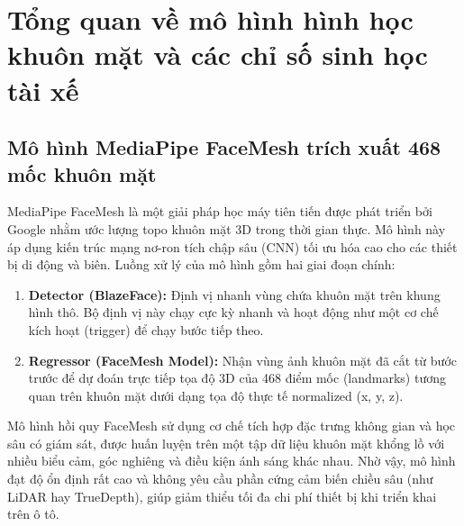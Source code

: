 \documentclass[../DoAn.tex]{subfiles}
\begin{document}
\section{Tổng quan về mô hình hình học khuôn mặt và các chỉ số sinh học tài xế}
\label{section:3.1}

\subsection{Mô hình MediaPipe FaceMesh trích xuất 468 mốc khuôn mặt}
MediaPipe FaceMesh là một giải pháp học máy tiên tiến được phát triển bởi Google nhằm ước lượng topo khuôn mặt 3D trong thời gian thực. Mô hình này áp dụng kiến trúc mạng nơ-ron tích chập sâu (CNN) tối ưu hóa cao cho các thiết bị di động và biên. Luồng xử lý của mô hình gồm hai giai đoạn chính:
\begin{enumerate}
    \item \textbf{Detector (BlazeFace):} Định vị nhanh vùng chứa khuôn mặt trên khung hình thô. Bộ định vị này chạy cực kỳ nhanh và hoạt động như một cơ chế kích hoạt (trigger) để chạy bước tiếp theo.
    \item \textbf{Regressor (FaceMesh Model):} Nhận vùng ảnh khuôn mặt đã cắt từ bước trước để dự đoán trực tiếp tọa độ 3D của 468 điểm mốc (landmarks) tương quan trên khuôn mặt dưới dạng tọa độ thực tế normalized (x, y, z).
\end{enumerate}

Mô hình hồi quy FaceMesh sử dụng cơ chế tích hợp đặc trưng không gian và học sâu có giám sát, được huấn luyện trên một tập dữ liệu khuôn mặt khổng lồ với nhiều biểu cảm, góc nghiêng và điều kiện ánh sáng khác nhau. Nhờ vậy, mô hình đạt độ ổn định rất cao và không yêu cầu phần cứng cảm biến chiều sâu (như LiDAR hay TrueDepth), giúp giảm thiểu tối đa chi phí thiết bị khi triển khai trên ô tô.
\end{document}
